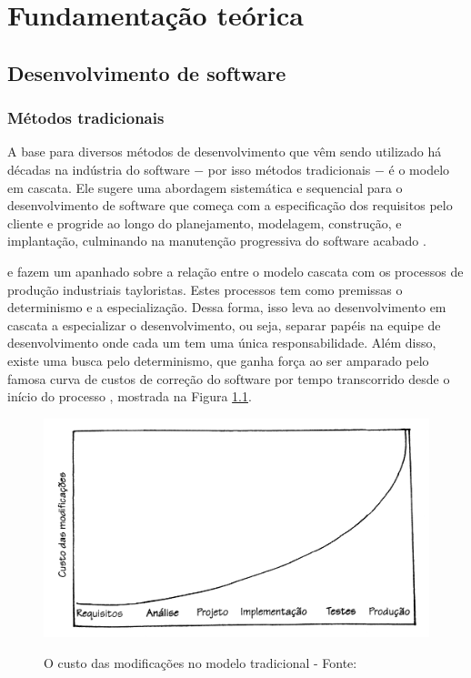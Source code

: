 \chapter{Fundamentação teórica}

\section{Desenvolvimento de software} %
\label{sec:desenvolvimento_de_software}


\subsection{Métodos tradicionais} %
\label{sub:metodos_tradicionais}

A base para diversos métodos de desenvolvimento que vêm sendo utilizado há décadas na indústria do software $-$ por isso métodos tradicionais $-$ é o modelo em cascata. Ele sugere uma abordagem sistemática e sequencial para o desenvolvimento de software que começa com a especificação dos requisitos pelo cliente e progride ao longo do planejamento, modelagem, construção, e implantação, culminando na manutenção progressiva do software acabado \cite{Pressman}.

 e  fazem um apanhado sobre a relação entre o modelo cascata com os processos de produção industriais tayloristas. Estes processos tem como premissas o determinismo e a especialização. Dessa forma, isso leva ao desenvolvimento em cascata a especializar o desenvolvimento, ou seja, separar papéis na equipe de desenvolvimento onde cada um tem uma única responsabilidade. Além disso, existe uma busca pelo determinismo, que ganha força ao ser amparado pelo famosa curva de custos de correção do software por tempo transcorrido desde o início do processo \cite{Boehm}, mostrada na Figura \ref{img:custo-cascata}.

\begin{figure}[h]
  \center
  \caption{O custo das modificações no modelo tradicional - Fonte: \cite{XPKent}}
  \includegraphics[scale=0.35]{images/custo-cascata}
  \label{img:custo-cascata}
\end{figure}


